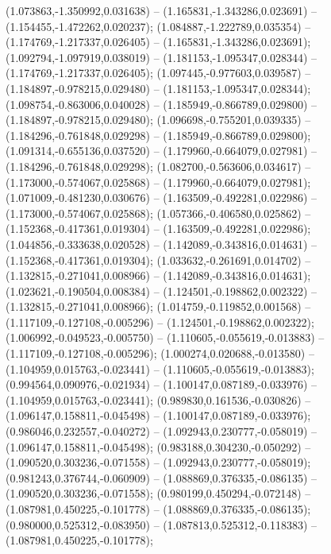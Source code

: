  (1.073863,-1.350992,0.031638) -- (1.165831,-1.343286,0.023691) -- (1.154455,-1.472262,0.020237);
 (1.084887,-1.222789,0.035354) -- (1.174769,-1.217337,0.026405) -- (1.165831,-1.343286,0.023691);
 (1.092794,-1.097919,0.038019) -- (1.181153,-1.095347,0.028344) -- (1.174769,-1.217337,0.026405);
 (1.097445,-0.977603,0.039587) -- (1.184897,-0.978215,0.029480) -- (1.181153,-1.095347,0.028344);
 (1.098754,-0.863006,0.040028) -- (1.185949,-0.866789,0.029800) -- (1.184897,-0.978215,0.029480);
 (1.096698,-0.755201,0.039335) -- (1.184296,-0.761848,0.029298) -- (1.185949,-0.866789,0.029800);
 (1.091314,-0.655136,0.037520) -- (1.179960,-0.664079,0.027981) -- (1.184296,-0.761848,0.029298);
 (1.082700,-0.563606,0.034617) -- (1.173000,-0.574067,0.025868) -- (1.179960,-0.664079,0.027981);
 (1.071009,-0.481230,0.030676) -- (1.163509,-0.492281,0.022986) -- (1.173000,-0.574067,0.025868);
 (1.057366,-0.406580,0.025862) -- (1.152368,-0.417361,0.019304) -- (1.163509,-0.492281,0.022986);
 (1.044856,-0.333638,0.020528) -- (1.142089,-0.343816,0.014631) -- (1.152368,-0.417361,0.019304);
 (1.033632,-0.261691,0.014702) -- (1.132815,-0.271041,0.008966) -- (1.142089,-0.343816,0.014631);
 (1.023621,-0.190504,0.008384) -- (1.124501,-0.198862,0.002322) -- (1.132815,-0.271041,0.008966);
 (1.014759,-0.119852,0.001568) -- (1.117109,-0.127108,-0.005296) -- (1.124501,-0.198862,0.002322);
 (1.006992,-0.049523,-0.005750) -- (1.110605,-0.055619,-0.013883) -- (1.117109,-0.127108,-0.005296);
 (1.000274,0.020688,-0.013580) -- (1.104959,0.015763,-0.023441) -- (1.110605,-0.055619,-0.013883);
 (0.994564,0.090976,-0.021934) -- (1.100147,0.087189,-0.033976) -- (1.104959,0.015763,-0.023441);
 (0.989830,0.161536,-0.030826) -- (1.096147,0.158811,-0.045498) -- (1.100147,0.087189,-0.033976);
 (0.986046,0.232557,-0.040272) -- (1.092943,0.230777,-0.058019) -- (1.096147,0.158811,-0.045498);
 (0.983188,0.304230,-0.050292) -- (1.090520,0.303236,-0.071558) -- (1.092943,0.230777,-0.058019);
 (0.981243,0.376744,-0.060909) -- (1.088869,0.376335,-0.086135) -- (1.090520,0.303236,-0.071558);
 (0.980199,0.450294,-0.072148) -- (1.087981,0.450225,-0.101778) -- (1.088869,0.376335,-0.086135);
 (0.980000,0.525312,-0.083950) -- (1.087813,0.525312,-0.118383) -- (1.087981,0.450225,-0.101778);
